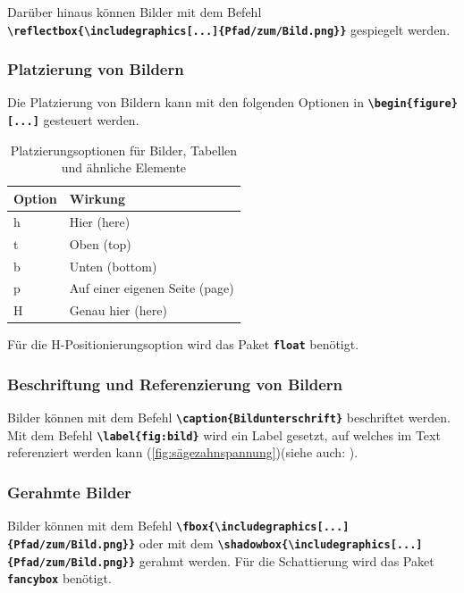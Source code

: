 Darüber hinaus können Bilder mit dem Befehl \texttt{\textbf{\textbackslash reflectbox\{\textbackslash includegraphics[...]\{Pfad/zum/Bild.png\}\}}} gespiegelt werden.

\subsubsection{Platzierung von Bildern}
Die Platzierung von Bildern kann mit den folgenden Optionen in \textbf{\texttt{\textbackslash begin\{figure\}[...]}} gesteuert werden.

\begin{table}[H]
    \centering
    \begin{tabular}{ll}
        \toprule
        \textbf{Option} & \textbf{Wirkung}               \\
        \midrule
        h               & Hier (here)                    \\
        t               & Oben (top)                     \\
        b               & Unten (bottom)                 \\
        p               & Auf einer eigenen Seite (page) \\
        H               & Genau hier (here)              \\
        \bottomrule
    \end{tabular}
    \caption{Platzierungsoptionen für Bilder, Tabellen und ähnliche Elemente}
    \label{tab:figure_options}
\end{table}

Für die H-Positionierungsoption wird das Paket \textbf{\texttt{float}} benötigt.

\subsubsection{Beschriftung und Referenzierung von Bildern}
Bilder können mit dem Befehl \textbf{\texttt{\textbackslash caption\{Bildunterschrift\}}} beschriftet werden. Mit dem Befehl \textbf{\texttt{\textbackslash label\{fig:bild\}}} wird ein Label gesetzt, auf welches im Text referenziert werden kann (\autoref{fig:sägezahnspannung})(siehe auch: ).

\subsubsection{Gerahmte Bilder}
Bilder können mit dem Befehl \textbf{\texttt{\textbackslash fbox\{\textbackslash includegraphics[...]\{Pfad/zum/Bild.png\}\}}} oder mit dem \textbf{\texttt{\textbackslash shadowbox\{\textbackslash includegraphics[...]\{Pfad/zum/Bild.png\}\}}} gerahmt werden. Für die Schattierung wird das Paket \textbf{\texttt{fancybox}} benötigt.

